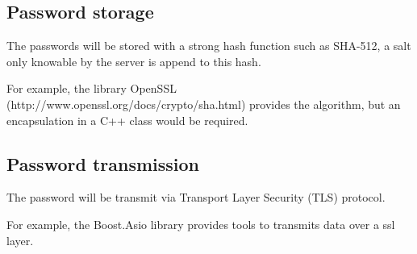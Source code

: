 \subsection{Password storage}
\label{section:security:passwordstorage}

The passwords will be stored with a strong hash function such as SHA-512, a salt only knowable by the server is append to this hash. 
\newline

For example, the library OpenSSL (http://www.openssl.org/docs/crypto/sha.html) provides the algorithm, but an encapsulation in a C++ class would be required.

\subsection{Password transmission}
\label{section:security:passwordtransmission}

The password will be transmit via Transport Layer Security (TLS) protocol.
\newline

For example, the Boost.Asio library provides tools to transmits data over a ssl layer.